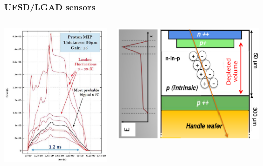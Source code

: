 \documentclass[aspectratio=169]{beamer}
\begin{document}
	
	\begin{frame}
	\frametitle{UFSD/LGAD sensors}
	\begin{columns}
		\begin{center}	
			\includegraphics[width=0.9 \textwidth]{IMG/LGAD_Signal.PNG}
		\end{center}
	\begin{columns}
			\begin{center}
				\includegraphics[width=1 \textwidth]{IMG/UFSDLGAD.PNG}

\end{center}
\end{columns}
\end{columns}
\end{frame}
\end{document}
